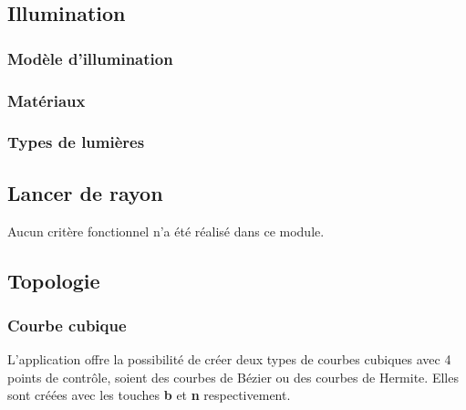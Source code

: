 \subsection{Illumination}
\subsubsection{Modèle d'illumination}
\label{s:illumination}

%

\subsubsection{Matériaux}
\label{s:materiaux}

\subsubsection{Types de lumières}
\label{lumiere}

\subsection{Lancer de rayon}

Aucun critère fonctionnel n'a été réalisé dans ce module.

\subsection{Topologie}
\subsubsection{Courbe cubique}
\label{s:courbe_cubique}
L'application offre la possibilité de créer deux types de courbes cubiques avec 4 points de contrôle, soient des courbes de Bézier ou des courbes de Hermite.
Elles sont créées avec les touches \textbf{b} et \textbf{n} respectivement.

